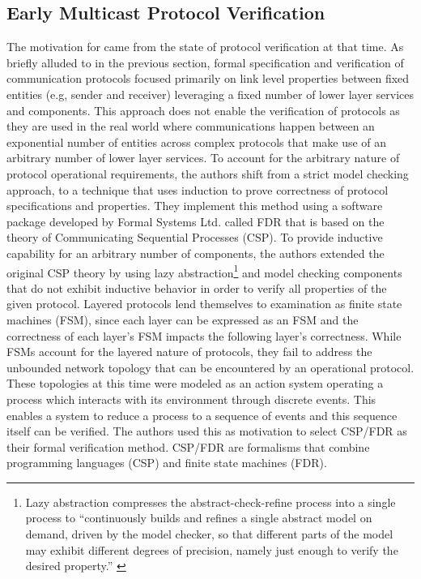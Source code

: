 \documentclass[12pt, fullpage]{article}
\begin{document}
\subsection{Early Multicast Protocol Verification}
The motivation for \cite{Creese1999} came from the state of protocol verification at that time. As briefly alluded to in the previous section, formal specification and verification of communication protocols focused primarily on link level properties between fixed entities (e.g, sender and receiver) leveraging a fixed number of lower layer services and components. This approach does not enable the verification of protocols as they are used in the real world where communications happen between an exponential number of entities across complex protocols that make use of an arbitrary number of lower layer services. 
\bigbreak
To account for the arbitrary nature of protocol operational requirements, the authors shift from a strict model checking approach, to a technique that uses induction to prove correctness of protocol specifications and properties. They implement this method using a software package developed by Formal Systems Ltd. called FDR that is based on the theory of Communicating Sequential Processes (CSP). To provide inductive capability for an arbitrary number of components, the authors extended the original CSP theory by using lazy abstraction\footnote{Lazy abstraction compresses the abstract-check-refine process into a single process to ``continuously builds and refines a single abstract model on demand, driven by the model checker, so that different parts of the model may exhibit different degrees of precision, namely just enough to verify the desired property.'' \cite{Henzinger2002}} and model checking components that do not exhibit inductive behavior in order to verify all properties of the given protocol. 
\bigbreak
Layered protocols lend themselves to examination as finite state machines (FSM), since each layer can be expressed as an FSM and the correctness of each layer's FSM impacts the following layer's correctness. While FSMs account for the layered nature of protocols, they fail to address the unbounded network topology that can be encountered by an operational protocol. These topologies at this time were modeled as an action system operating a process which interacts with its environment through discrete events. This enables a system to reduce a process to a sequence of events and this sequence itself can be verified. The authors used this as motivation to select CSP/FDR as their formal verification method. CSP/FDR are formalisms that combine programming languages (CSP) and finite state machines (FDR).
\end{document}
